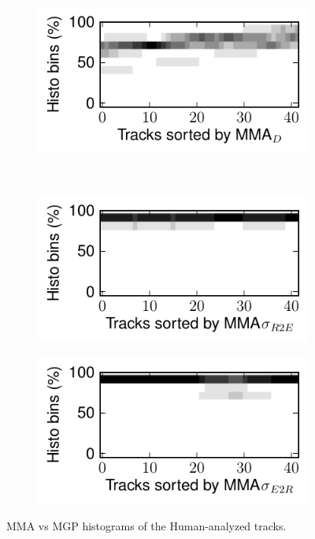 \documentclass{article}
\begin{document}
\begin{figure}
      \begin{subfigure}[b]{0.25\textwidth}
              \includegraphics[width=\textwidth]{plots/histo-human-D.pdf}
              \caption{}
              \label{fig:histo-human-D}
      \end{subfigure}%
      ~ 
      \begin{subfigure}[b]{0.25\textwidth}
              \includegraphics[width=\textwidth]{plots/histo-human-DevA2E.pdf}
              \caption{}
              \label{fig:histo-human-DevA2E}
      \end{subfigure}%
       
      \begin{subfigure}[b]{0.25\textwidth}
              \includegraphics[width=\textwidth]{plots/histo-human-DevE2A.pdf}
              \caption{}
              \label{fig:histo-human-DevE2A}
      \end{subfigure}%

      \caption{MMA vs MGP histograms of the Human-analyzed tracks.}\label{fig:human-eval}
\end{figure}
\end{document}
